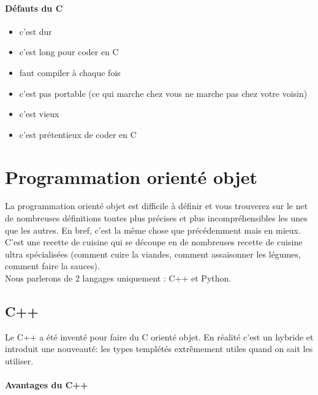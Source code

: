 \documentclass[a4paper,10pt]{book_ad}
\begin{document}
\paragraph{Défauts du C}

\begin{itemize}
\item c'est dur
\item c'est long pour coder en C
\item faut compiler à chaque fois
\item c'est pas portable (ce qui marche chez vous ne marche pas chez votre voisin)
\item c'est vieux
\item c'est prétentieux de coder en C
\end{itemize}

\section{Programmation orienté objet}

La programmation orienté objet est difficile à définir et vous trouverez sur le net de nombreuses 
définitions toutes plus précises et plus incompréhensibles les unes que les autres.
 En bref, c'est la même chose que précédemment mais en mieux. C'est une recette de cuisine qui se 
découpe en de nombreuses recette de cuisine ultra spécialisées (comment cuire la viandes,
 comment assaisonner les légumes, comment faire la sauces).\\


Nous parlerons de 2 langages uniquement : C++ et Python. 

\subsection{C++}

Le C++ a été inventé pour faire du C orienté objet. En réalité c'est un hybride et introduit une
nouveauté: les types templétés extrêmement utiles quand on sait les utiliser.


\paragraph{Avantages du C++}
\end{document}
